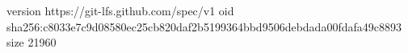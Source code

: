 version https://git-lfs.github.com/spec/v1
oid sha256:c8033e7c9d08580ec25cb820daf2b5199364bbd9506debdada00fdafa49c8893
size 21960
